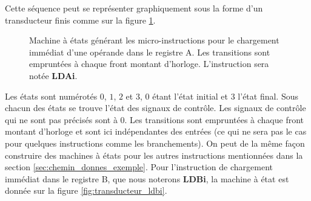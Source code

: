 Cette séquence peut se représenter graphiquement sous la forme d'un transducteur finis comme sur la figure \ref{fig:transducteur_ldai}.

\begin{figure}[htbp]
  \centering{}
  \caption{\label{fig:transducteur_ldai} Machine à états générant les micro-instructions pour le chargement immédiat d'une opérande dans le registre A. Les transitions sont empruntées à chaque front montant d'horloge. L'instruction sera notée \textbf{LDAi}.}
\end{figure}

Les états sont numérotés $0$, $1$, $2$ et $3$, $0$ étant l'état initial et $3$ l'état final. Sous chacun des états se trouve l'état des signaux de contrôle. Les signaux de contrôle qui ne sont pas précisés sont à $0$. Les transitions sont empruntées à chaque front montant d'horloge et sont ici indépendantes des entrées (ce qui ne sera pas le cas pour quelques instructions comme les branchements). On peut de la même façon construire des machines à états pour les autres instructions mentionnées dans la section \ref{sec:chemin_donnes_exemple}. Pour l'instruction de chargement immédiat dans le registre B, que nous noterons \textbf{LDBi}, la machine à état est donnée sur la figure \ref{fig:transducteur_ldbi}.

